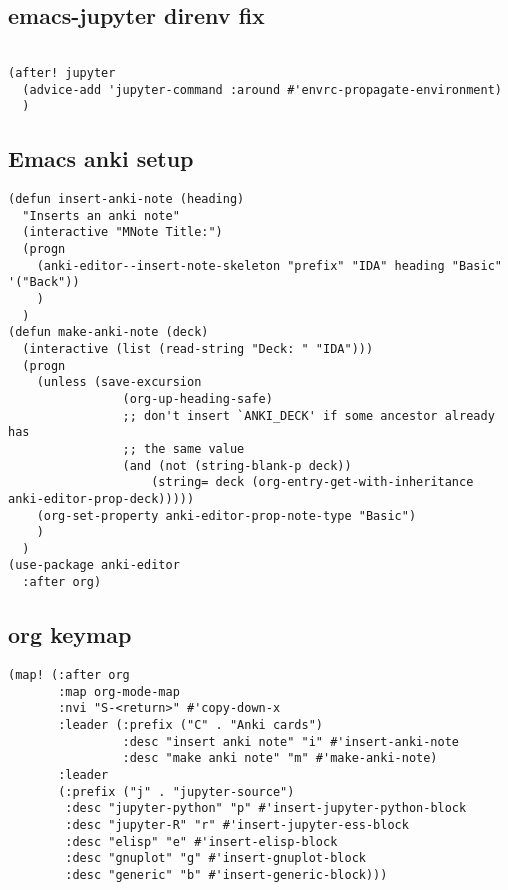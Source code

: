 \documentclass{assignments}
\begin{document}
\subsection*{emacs-jupyter direnv fix}
\label{sec:orgf7ee09b}
\begin{verbatim}

(after! jupyter
  (advice-add 'jupyter-command :around #'envrc-propagate-environment)
  )
\end{verbatim}

\subsection*{Emacs anki setup}
\label{sec:org127df47}
\begin{verbatim}
(defun insert-anki-note (heading)
  "Inserts an anki note"
  (interactive "MNote Title:")
  (progn
    (anki-editor--insert-note-skeleton "prefix" "IDA" heading "Basic" '("Back"))
    )
  )
(defun make-anki-note (deck)
  (interactive (list (read-string "Deck: " "IDA")))
  (progn
    (unless (save-excursion
                (org-up-heading-safe)
                ;; don't insert `ANKI_DECK' if some ancestor already has
                ;; the same value
                (and (not (string-blank-p deck))
                    (string= deck (org-entry-get-with-inheritance anki-editor-prop-deck)))))
    (org-set-property anki-editor-prop-note-type "Basic")
    )
  )
(use-package anki-editor
  :after org)
\end{verbatim}

\subsection*{org keymap}
\label{sec:orga072c9d}
\begin{verbatim}
(map! (:after org
       :map org-mode-map
       :nvi "S-<return>" #'copy-down-x
       :leader (:prefix ("C" . "Anki cards")
                :desc "insert anki note" "i" #'insert-anki-note
                :desc "make anki note" "m" #'make-anki-note)
       :leader
       (:prefix ("j" . "jupyter-source")
        :desc "jupyter-python" "p" #'insert-jupyter-python-block
        :desc "jupyter-R" "r" #'insert-jupyter-ess-block
        :desc "elisp" "e" #'insert-elisp-block
        :desc "gnuplot" "g" #'insert-gnuplot-block
        :desc "generic" "b" #'insert-generic-block)))
\end{verbatim}
\end{document}
